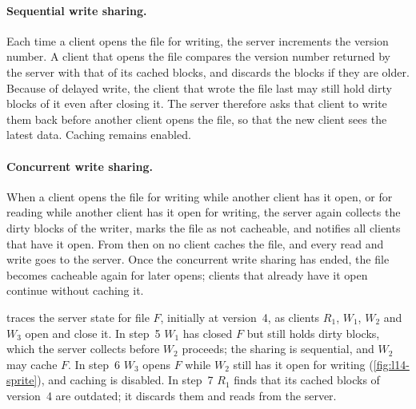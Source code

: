 \documentclass[../main.tex]{subfiles}
\begin{document}
\paragraph{Sequential write sharing.}  Each time a client opens the file
for writing, the server increments the version number.  A client that
opens the file compares the version number returned by the server with
that of its cached blocks, and discards the blocks if they are older.
Because of delayed write, the client that wrote the file last may still
hold dirty blocks of it even after closing it.  The server therefore asks
that client to write them back before another client opens the file, so
that the new client sees the latest data.  Caching remains enabled.

\paragraph{Concurrent write sharing.}  When a client opens the file for
writing while another client has it open, or for reading while another
client has it open for writing, the server again collects the dirty blocks
of the writer, marks the file as not cacheable, and notifies all clients
that have it open.  From then on no client caches the file, and every read
and write goes to the server.  Once the concurrent write sharing has ended,
the file becomes cacheable again for later opens; clients that already
have it open continue without caching it.

\begin{example}
   traces the server state for file $F$,
  initially at version~4, as clients $R_1$, $W_1$, $W_2$ and $W_3$ open and
  close it.  In step~5 $W_1$ has closed $F$ but still holds dirty blocks,
  which the server collects before $W_2$ proceeds; the sharing is
  sequential, and $W_2$ may cache $F$.  In step~6 $W_3$ opens $F$ while
  $W_2$ still has it open for writing (\cref{fig:l14-sprite}), and caching
  is disabled.  In step~7 $R_1$ finds that its cached blocks of version~4
  are outdated; it discards them and reads from the server.
\end{example}
\end{document}
